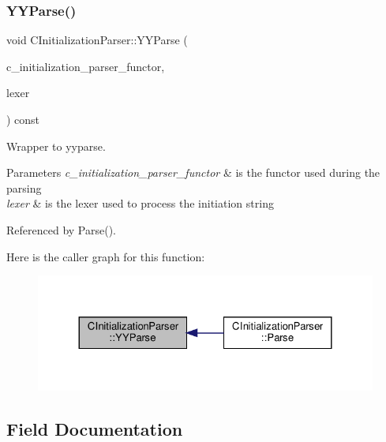 \subsubsection{\texorpdfstring{Y\+Y\+Parse()}{YYParse()}}
{\footnotesize\ttfamily void C\+Initialization\+Parser\+::\+Y\+Y\+Parse (\begin{DoxyParamCaption}\item[{const \hyperlink{c__initialization__parser__functor_8hpp_a6ef48614177b399e30c2c728bd1aa4a0}{C\+Initialization\+Parser\+Functor\+Ref}}]{c\+\_\+initialization\+\_\+parser\+\_\+functor,  }\item[{const \hyperlink{c__initialization__flex__lexer_8hpp_a571e9c81197651ff0497743befda055c}{C\+Initialization\+Flex\+Lexer\+Ref}}]{lexer }\end{DoxyParamCaption}) const\hspace{0.3cm}{\ttfamily [private]}}



Wrapper to yyparse. 


\begin{DoxyParams}{Parameters}
{\em c\+\_\+initialization\+\_\+parser\+\_\+functor} & is the functor used during the parsing \\
\hline
{\em lexer} & is the lexer used to process the initiation string \\
\hline
\end{DoxyParams}


Referenced by Parse().

Here is the caller graph for this function\+:
\nopagebreak
\begin{figure}[H]
\begin{center}
\leavevmode
\includegraphics[width=324pt]{d5/d61/classCInitializationParser_a704d7f054b52727705ba9f1d9b1c56f1_icgraph}
\end{center}
\end{figure}


\subsection{Field Documentation}
\mbox{\label{classCInitializationParser_ace27f0d73687b6f9ed247ecaffe452fe}} 
